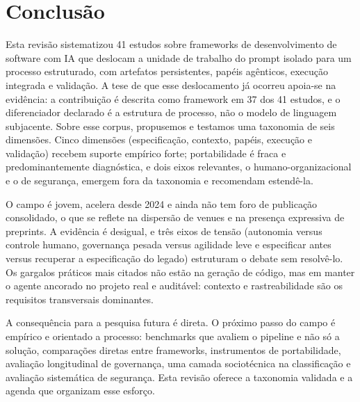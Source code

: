 \section{Conclusão}

Esta revisão sistematizou 41 estudos sobre frameworks de desenvolvimento de software com IA que deslocam a unidade de trabalho do prompt isolado para um processo estruturado, com artefatos persistentes, papéis agênticos, execução integrada e validação. A tese de que esse deslocamento já ocorreu apoia-se na evidência: a contribuição é descrita como framework em 37 dos 41 estudos, e o diferenciador declarado é a estrutura de processo, não o modelo de linguagem subjacente. Sobre esse corpus, propusemos e testamos uma taxonomia de seis dimensões. Cinco dimensões (especificação, contexto, papéis, execução e validação) recebem suporte empírico forte; portabilidade é fraca e predominantemente diagnóstica, e dois eixos relevantes, o humano-organizacional e o de segurança, emergem fora da taxonomia e recomendam estendê-la.

O campo é jovem, acelera desde 2024 e ainda não tem foro de publicação consolidado, o que se reflete na dispersão de venues e na presença expressiva de preprints. A evidência é desigual, e três eixos de tensão (autonomia versus controle humano, governança pesada versus agilidade leve e especificar antes versus recuperar a especificação do legado) estruturam o debate sem resolvê-lo. Os gargalos práticos mais citados não estão na geração de código, mas em manter o agente ancorado no projeto real e auditável: contexto e rastreabilidade são os requisitos transversais dominantes.

A consequência para a pesquisa futura é direta. O próximo passo do campo é empírico e orientado a processo: benchmarks que avaliem o pipeline e não só a solução, comparações diretas entre frameworks, instrumentos de portabilidade, avaliação longitudinal de governança, uma camada sociotécnica na classificação e avaliação sistemática de segurança. Esta revisão oferece a taxonomia validada e a agenda que organizam esse esforço.
